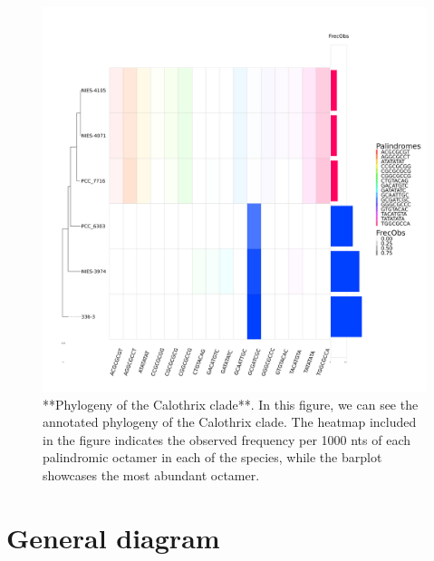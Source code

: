 \documentclass[
]{book}
\begin{document}
\begin{figure}

{\centering \includegraphics[width=0.8\linewidth]{Clados/Callothrix_clade/figures/Calothrix_Octanuc_FrecObs_sel32_filogenia_HIG} 

}

\caption{**Phylogeny of the Calothrix clade**. In this figure, we can see the annotated phylogeny of the Calothrix clade. The heatmap included in the figure indicates the observed frequency per 1000 nts of each palindromic octamer in each of the species, while the barplot showcases the most abundant octamer.}\label{fig:FIG1x}
\end{figure}

\hypertarget{general-diagram}{%
\section{General diagram}\label{general-diagram}}
\end{document}

